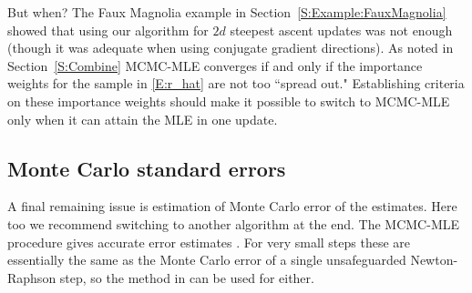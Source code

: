 But when?  
The Faux Magnolia example in Section~\ref{S:Example:FauxMagnolia} showed that using 
our algorithm for $2d$ steepest ascent updates was not enough (though it was adequate when
 using conjugate gradient directions).
As noted in Section~\ref{S:Combine} MCMC-MLE converges if and only 
if the importance weights for the sample in \eqref{E:r_hat} are not too 
``spread out."  Establishing criteria on these importance weights should make it 
possible to switch to MCMC-MLE only when it can attain the MLE in one update.

\subsection{Monte Carlo standard errors}
 A final remaining issue is estimation of Monte Carlo error of the estimates.  
 Here too we recommend switching to another
algorithm at the end.  The MCMC-MLE procedure gives accurate error estimates \citep{Geyer:1994,Hunter:2006}.
For very small steps these are essentially the same as the Monte Carlo error of a single unsafeguarded Newton-Raphson step,
so the method in \citep{Geyer:1994} can be used for either.




